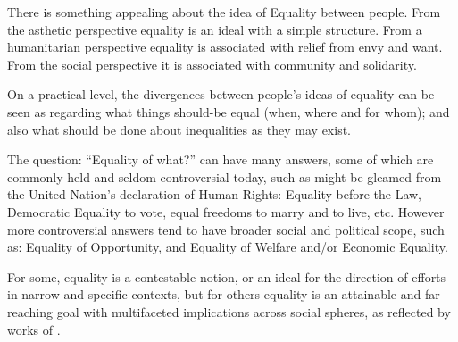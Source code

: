 There is something appealing about the idea of Equality between people.
From the asthetic perspective equality is an ideal with a simple structure. From a humanitarian perspective equality is associated with relief from envy and want. From the social perspective it is associated with community and solidarity.%


On a practical level, the divergences between people's ideas of equality can be seen as regarding what things should-be equal (when, where and for whom); and also what should be done about inequalities as they may exist.

The question: ``Equality of what?'' can have many answers, some of which are commonly held and seldom controversial today, such as might be gleamed from the United Nation's declaration of Human Rights: Equality before the Law, Democratic Equality to vote, equal freedoms to marry and to live, etc.
However more controversial answers tend to have broader social and political scope, such as: Equality of Opportunity, and Equality of Welfare and/or Economic Equality.%

For some, equality is a contestable notion, or an ideal for the direction of efforts in narrow and specific contexts, but for others equality is an attainable and far-reaching goal with multifaceted implications across social spheres, as reflected by works of \cite{walzer2008spheres,millerandwalzer,baker1992arguing}.

